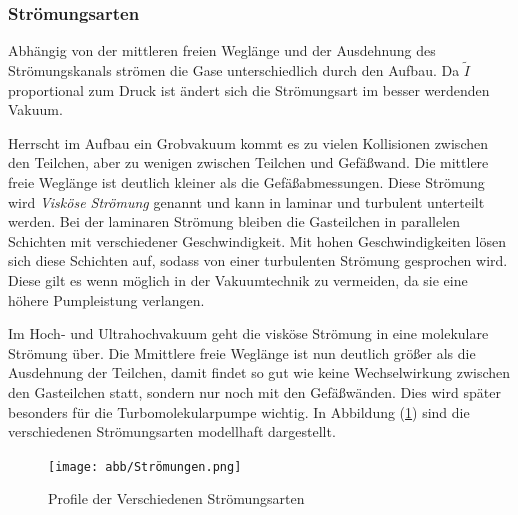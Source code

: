 \subsubsection*{Strömungsarten}
Abhängig von der mittleren freien Weglänge
und der Ausdehnung des Strömungskanals strömen die Gase unterschiedlich durch den Aufbau.
Da $\tilde{I}$ proportional zum Druck ist ändert sich die Strömungsart im besser werdenden Vakuum.

Herrscht im Aufbau ein Grobvakuum kommt es zu vielen Kollisionen zwischen den Teilchen,
aber zu wenigen zwischen Teilchen und Gefäßwand.
Die mittlere freie Weglänge ist deutlich kleiner als die Gefäßabmessungen.
Diese Strömung wird \textit{Visköse Strömung} genannt 
und kann in laminar und turbulent unterteilt werden.
Bei der laminaren Strömung bleiben die Gasteilchen in parallelen Schichten mit verschiedener Geschwindigkeit.
Mit hohen Geschwindigkeiten lösen sich diese Schichten auf, 
sodass von einer turbulenten Strömung gesprochen wird. 
Diese gilt es wenn möglich in der Vakuumtechnik zu vermeiden,
da sie eine höhere Pumpleistung verlangen.

Im Hoch- und Ultrahochvakuum geht die visköse Strömung in eine molekulare Strömung über.
Die Mmittlere freie Weglänge ist nun deutlich größer als die Ausdehnung der Teilchen,
damit findet so gut wie keine Wechselwirkung zwischen den Gasteilchen statt,
sondern nur noch mit den Gefäßwänden.
Dies wird später besonders für die Turbomolekularpumpe wichtig.
In Abbildung (\ref{fig:strömung}) sind die verschiedenen Strömungsarten modellhaft dargestellt.
\begin{figure}[h]
    \centering
    \texttt{[image: abb/Strömungen.png]}
    \caption{Profile der Verschiedenen Strömungsarten \cite{Pfeifer}}
    \label{fig:strömung}
\end{figure}

